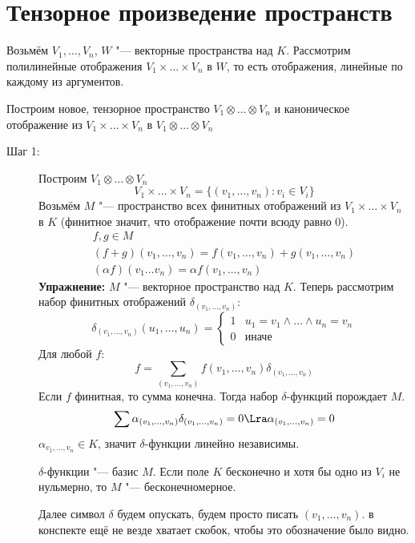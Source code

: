 ﻿\section{Тензорное произведение пространств}

Возьмём $V_1, \dots, V_n$, $W$ "--- векторные пространства над $K$.
Рассмотрим полилинейные отображения $V_1 \times \dots \times V_n$ в $W$,
то есть отображения, линейные по каждому из аргументов.

Построим новое, тензорное пространство $V_1 \otimes \dots \otimes V_n$
и каноническое отображение из $V_1 \times \dots \times V_n$ в $V_1 \otimes \dots \otimes V_n$

\begin{description}
\item[Шаг 1:]
	Построим $V_1 \otimes \dots \otimes V_n$
	\[ V_1 \times \dots \times V_n = \{(v_1, \dots, v_n)\colon v_i \in V_i\} \]
	Возьмём $M$ "--- пространство всех финитных отображений из $V_1 \times \dots \times V_n$ в $K$
	(финитное значит, что отображение почти всюду равно 0).
	\begin{gather*}
		f, g \in M \\
		(f + g)(v_1, \dots, v_n) = f(v_1, \dots, v_n) + g(v_1, \dots, v_n) \\
		(\alpha f)(v_1 \dots v_n) = \alpha f(v_1, \dots, v_n)
	\end{gather*}
	\textbf{Упражнение:} $M$ "--- векторное пространство над $K$.
	Теперь рассмотрим набор финитных отображений $\delta_{(v_1,\dots, v_n)}$:
	\[
		\delta_{(v_1,\dots, v_n)}(u_1, \dots, u_n) = \begin{cases}
			1 & u_1 = v_1 \land \dots \land u_n = v_n \\
			0 & \text{иначе}
		\end{cases}
	\]
	Для любой $f$:
	\[ f = \sum_{(v_1, \dots, v_n)} f(v_1, \dots, v_n)\delta_{(v_1, \dots, v_n)} \]
	Если $f$ финитная, то сумма конечна.
	Тогда набор $\delta$-функций порождает $M$.
	\[ \sum \alpha_{(v_1, \dots, v_n)} \delta_{(v_1, \dots, v_n)} = 0 \Lra \alpha_{(v_1, \dots, v_n)} = 0 \]
	$\alpha_{v_1, \dots, v_n} \in K$, значит $\delta$-функции линейно независимы.

	$\delta$-функции "--- базис $M$.
	Если поле $K$ бесконечно и хотя бы одно из $V_i$ не нульмерно, то $M$ "--- бесконечномерное.

	Далее символ $\delta$ будем опускать, будем просто писать $(v_1, \dots, v_n)$.
	\TODO в конспекте ещё не везде хватает скобок, чтобы это обозначение было видно.


\end{description}
